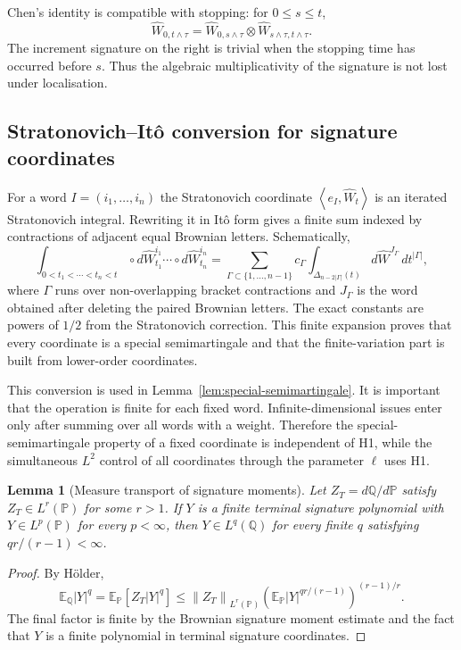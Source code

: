 \documentclass[11pt,oneside]{article}
\theoremstyle{plain}
\newtheorem{lemma}[theorem]{Lemma}
\theoremstyle{definition}
\theoremstyle{remark}
\newcommand{\E}{\mathbb{E}}
\newcommand{\Q}{\mathbb{Q}}
\newcommand{\Pp}{\mathbb{P}}
\newcommand{\cW}{\widehat W}
\newcommand{\norm}[1]{\left\lVert #1\right\rVert}
\newcommand{\abs}[1]{\left\lvert #1\right\rvert}
\newcommand{\inner}[2]{\left\langle #1,#2\right\rangle}
\begin{document}
Chen's identity is compatible with stopping: for $0\leq s\leq t$,
\[
\cW_{0,t\wedge\tau}=\cW_{0,s\wedge\tau}\otimes \cW_{s\wedge\tau,t\wedge\tau}.
\]
The increment signature on the right is trivial when the stopping time has occurred before $s$. Thus the algebraic multiplicativity of the signature is not lost under localisation.


\subsection*{Stratonovich--It\^o conversion for signature coordinates}
For a word $I=(i_1,\ldots,i_n)$ the Stratonovich coordinate $\inner{e_I}{\cW_t}$ is an iterated Stratonovich integral. Rewriting it in It\^o form gives a finite sum indexed by contractions of adjacent equal Brownian letters. Schematically,
\[
\int_{0<t_1<\cdots<t_n<t}\circ d\cW^{i_1}_{t_1}\cdots \circ d\cW^{i_n}_{t_n}
=\sum_{\Gamma\subset\{1,\ldots,n-1\}}c_\Gamma
\int_{\Delta_{n-2|\Gamma|}(t)} d\cW^{J_\Gamma}_{}\,dt^{|\Gamma|},
\]
where $\Gamma$ runs over non-overlapping bracket contractions and $J_\Gamma$ is the word obtained after deleting the paired Brownian letters. The exact constants are powers of $1/2$ from the Stratonovich correction. This finite expansion proves that every coordinate is a special semimartingale and that the finite-variation part is built from lower-order coordinates.

This conversion is used in Lemma~\ref{lem:special-semimartingale}. It is important that the operation is finite for each fixed word. Infinite-dimensional issues enter only after summing over all words with a weight. Therefore the special-semimartingale property of a fixed coordinate is independent of H1, while the simultaneous $L^2$ control of all coordinates through the parameter $\ell$ uses H1.

\begin{lemma}[Measure transport of signature moments]
\label{lem:measure-transport-signature}
Let $Z_T=d\Q/d\Pp$ satisfy $Z_T\in L^r(\Pp)$ for some $r>1$. If $Y$ is a finite terminal signature polynomial with $Y\in L^p(\Pp)$ for every $p<\infty$, then $Y\in L^q(\Q)$ for every finite $q$ satisfying $qr/(r-1)<\infty$.
\end{lemma}

\begin{proof}
By H\"older,
\[
\E_\Q\abs{Y}^q=\E_\Pp[Z_T\abs{Y}^q]
\leq \norm{Z_T}_{L^r(\Pp)}\left(\E_\Pp\abs{Y}^{q r/(r-1)}\right)^{(r-1)/r}.
\]
The final factor is finite by the Brownian signature moment estimate and the fact that $Y$ is a finite polynomial in terminal signature coordinates.
\end{proof}
\end{document}
